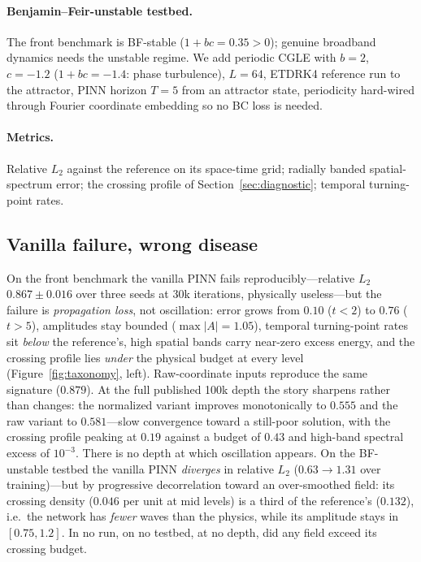\documentclass[10pt]{article}
\begin{document}
\paragraph{Benjamin--Feir-unstable testbed.} The front benchmark is BF-stable
($1+bc = 0.35 > 0$); genuine broadband dynamics needs the unstable regime. We add
periodic CGLE with $b{=}2$, $c{=}-1.2$ ($1+bc = -1.4$: phase turbulence), $L{=}64$,
ETDRK4 reference \citep{kassam2005etdrk4} run to the attractor, PINN horizon
$T{=}5$ from an attractor state, periodicity hard-wired through Fourier coordinate
embedding so no BC loss is needed.

\paragraph{Metrics.} Relative $L_2$ against the reference on its space-time grid;
radially banded spatial-spectrum error; the crossing profile of
Section~\ref{sec:diagnostic}; temporal turning-point rates.

\subsection{Vanilla failure, wrong disease}

On the front benchmark the vanilla PINN fails reproducibly---relative $L_2$
$0.867\pm0.016$ over three seeds at 30k iterations, physically useless---but the
failure is \emph{propagation loss}, not oscillation: error grows from $0.10$
($t{<}2$) to $0.76$ ($t{>}5$), amplitudes stay bounded ($\max|A| = 1.05$),
temporal turning-point rates sit \emph{below} the reference's, high spatial bands
carry near-zero excess energy, and the crossing profile lies \emph{under} the
physical budget at every level (Figure~\ref{fig:taxonomy}, left). Raw-coordinate
inputs reproduce the same signature ($0.879$). At the full published 100k depth
the story sharpens rather than changes: the normalized variant improves
monotonically to $0.555$ and the raw variant to $0.581$---slow convergence toward
a still-poor solution, with the crossing profile peaking at $0.19$ against a
budget of $0.43$ and high-band spectral excess of $10^{-3}$. There is no depth at
which oscillation appears. On the BF-unstable testbed the vanilla PINN
\emph{diverges} in relative $L_2$ ($0.63\!\to\!1.31$ over training)---but by
progressive decorrelation toward an over-smoothed field: its crossing density
($0.046$ per unit at mid levels) is a third of the reference's ($0.132$), i.e.\ the
network has \emph{fewer} waves than the physics, while its amplitude stays in
$[0.75, 1.2]$. In no run, on no testbed, at no depth, did any field exceed its
crossing budget.
\end{document}
